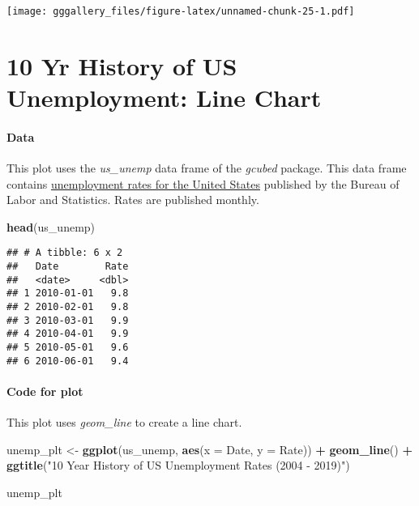 \documentclass[]{book}
\newenvironment{Shaded}{\begin{snugshade}}{\end{snugshade}}
\newcommand{\DataTypeTok}[1]{\textcolor[rgb]{0.13,0.29,0.53}{#1}}
\newcommand{\KeywordTok}[1]{\textcolor[rgb]{0.13,0.29,0.53}{\textbf{#1}}}
\newcommand{\NormalTok}[1]{#1}
\newcommand{\OperatorTok}[1]{\textcolor[rgb]{0.81,0.36,0.00}{\textbf{#1}}}
\newcommand{\StringTok}[1]{\textcolor[rgb]{0.31,0.60,0.02}{#1}}
\begin{document}
\texttt{[image: gggallery\_files/figure-latex/unnamed-chunk-25-1.pdf]}

\hypertarget{unemp}{%
\chapter*{10 Yr History of US Unemployment: Line Chart}\label{unemp}}

\hypertarget{unempdata}{%
\subsubsection*{Data}\label{unempdata}}

This plot uses the \emph{us\_unemp} data frame of the \emph{gcubed} package. This data frame contains \href{https://data.bls.gov/timeseries/LNS14000000}{unemployment rates for the United States} published by the Bureau of Labor and Statistics. Rates are published monthly.

\begin{Shaded}
\begin{Highlighting}[]
\KeywordTok{head}\NormalTok{(us_unemp)}
\end{Highlighting}
\end{Shaded}

\begin{verbatim}
## # A tibble: 6 x 2
##   Date        Rate
##   <date>     <dbl>
## 1 2010-01-01   9.8
## 2 2010-02-01   9.8
## 3 2010-03-01   9.9
## 4 2010-04-01   9.9
## 5 2010-05-01   9.6
## 6 2010-06-01   9.4
\end{verbatim}

\hypertarget{unempcode}{%
\subsubsection*{Code for plot}\label{unempcode}}

This plot uses \emph{geom\_line} to create a line chart.

\begin{Shaded}
\begin{Highlighting}[]
\NormalTok{unemp_plt <-}\StringTok{ }\KeywordTok{ggplot}\NormalTok{(us_unemp, }\KeywordTok{aes}\NormalTok{(}\DataTypeTok{x =}\NormalTok{ Date, }\DataTypeTok{y =}\NormalTok{ Rate)) }\OperatorTok{+}\StringTok{ }
\StringTok{  }\KeywordTok{geom_line}\NormalTok{() }\OperatorTok{+}\StringTok{ }
\StringTok{  }\KeywordTok{ggtitle}\NormalTok{(}\StringTok{"10 Year History of US Unemployment Rates (2004 - 2019)"}\NormalTok{)}

\NormalTok{unemp_plt}
\end{Highlighting}
\end{Shaded}
\end{document}
